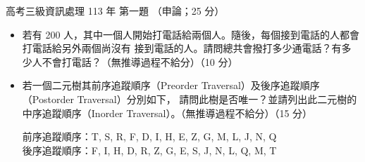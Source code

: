 \begin{pastexam}[label={px:gk3-113-ds-01}]{高考三級資訊處理 113 年 第一題}
（申論；25 分）

\begin{itemize}[leftmargin=2.2em]
\item[㈠] 若有 200 人，其中一個人開始打電話給兩個人。隨後，每個接到電話的人都會打電話給另外兩個尚沒有
接到電話的人。請問總共會撥打多少通電話？有多少人不會打電話？（無推導過程不給分）（10 分）
\item[㈡] 若一個二元樹其前序追蹤順序（Preorder Traversal）及後序追蹤順序（Postorder Traversal）分別如下，
請問此樹是否唯一？並請列出此二元樹的中序追蹤順序（Inorder Traversal）。（無推導過程不給分）（15 分）

前序追蹤順序：T, S, R, F, D, I, H, E, Z, G, M, L, J, N, Q\\
後序追蹤順序：F, I, H, D, R, Z, G, E, S, J, N, L, Q, M, T
\end{itemize}
\end{pastexam}


